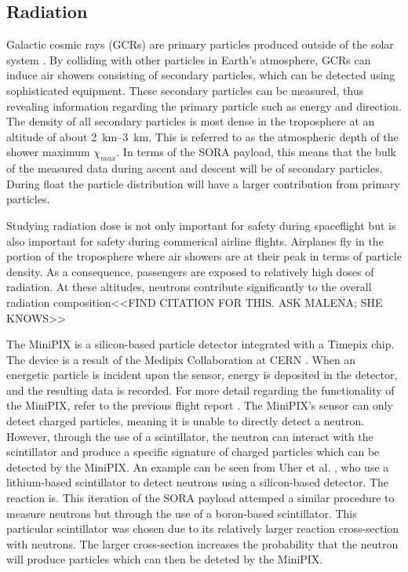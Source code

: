 \subsection{Radiation}
\label{sec: Radiation Background}

Galactic cosmic rays (GCRs) are primary particles produced outside of the solar system \cite{GCRs}.
By colliding with other particles in Earth's atmosphere, GCRs can induce air showers consisting of secondary particles, which can be detected using sophisticated equipment.
These secondary particles can be measured, thus revealing information regarding the primary particle such as energy and direction. 
The density of all secondary particles \cite{Frank} is most dense in the troposphere at an altitude of about \SIrange{2}{3}{\kilo\meter}.
This is referred to as the atmospheric depth of the shower maximum $\chi _{max}$.
In terms of the SORA payload, this means that the bulk of the measured data during ascent and descent will 
be of secondary particles.
During float the particle distribution will have a larger contribution from primary particles.

Studying radiation dose is not only important for safety during spaceflight but is also important for safety during commerical airline flights.
Airplanes fly in the portion of the troposphere where air showers are at their peak in terms of particle density. As a consequence, passengers are exposed to relatively high doses of radiation.
At these altitudes, neutrons contribute significantly to the overall radiation composition<<FIND CITATION FOR THIS. ASK MALENA; SHE KNOWS>>

The MiniPIX \cite{silicon_sensor} is a silicon-based particle detector integrated with a Timepix \cite{timepix} chip. The device is a result of the Medipix Collaboration at CERN \cite{medipix}. 
When an energetic particle is incident upon the sensor, energy is deposited in the detector, and the resulting data is recorded.
For more detail regarding the functionality of the MiniPIX, refer to the previous flight report \cite{SORA}.
The MiniPIX's sensor can only detect charged particles, meaning it is unable to directly detect a neutron. However, through the use of a scintillator, the neutron can interact with the scintillator and produce a specific signature of charged particles which can be detected by the MiniPIX.
An example can be seen from Uher et al. \cite{Uher}, who use a lithium-based scintillator to detect neutrons using a silicon-based detector. The reaction is.
This iteration of the SORA payload attemped a similar procedure to measure neutrons but through the use of a boron-based scintillator.
This particular scintillator was chosen due to its relatively larger reaction cross-section with neutrons.
The larger cross-section increases the probability that the neutron will produce particles which can then be deteted by the MiniPIX.